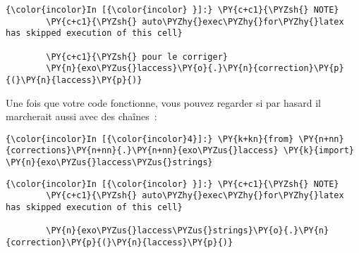     \begin{Verbatim}[commandchars=\\\{\}]
{\color{incolor}In [{\color{incolor} }]:} \PY{c+c1}{\PYZsh{} NOTE}
        \PY{c+c1}{\PYZsh{} auto\PYZhy{}exec\PYZhy{}for\PYZhy{}latex has skipped execution of this cell}
        
        \PY{c+c1}{\PYZsh{} pour le corriger}
        \PY{n}{exo\PYZus{}laccess}\PY{o}{.}\PY{n}{correction}\PY{p}{(}\PY{n}{laccess}\PY{p}{)}
\end{Verbatim}


    Une fois que votre code fonctionne, vous pouvez regarder si par hasard
il marcherait aussi avec des chaînes~:

    \begin{Verbatim}[commandchars=\\\{\}]
{\color{incolor}In [{\color{incolor}4}]:} \PY{k+kn}{from} \PY{n+nn}{corrections}\PY{n+nn}{.}\PY{n+nn}{exo\PYZus{}laccess} \PY{k}{import} \PY{n}{exo\PYZus{}laccess\PYZus{}strings}
\end{Verbatim}


    \begin{Verbatim}[commandchars=\\\{\}]
{\color{incolor}In [{\color{incolor} }]:} \PY{c+c1}{\PYZsh{} NOTE}
        \PY{c+c1}{\PYZsh{} auto\PYZhy{}exec\PYZhy{}for\PYZhy{}latex has skipped execution of this cell}
        
        \PY{n}{exo\PYZus{}laccess\PYZus{}strings}\PY{o}{.}\PY{n}{correction}\PY{p}{(}\PY{n}{laccess}\PY{p}{)}
\end{Verbatim}



    
    
    
